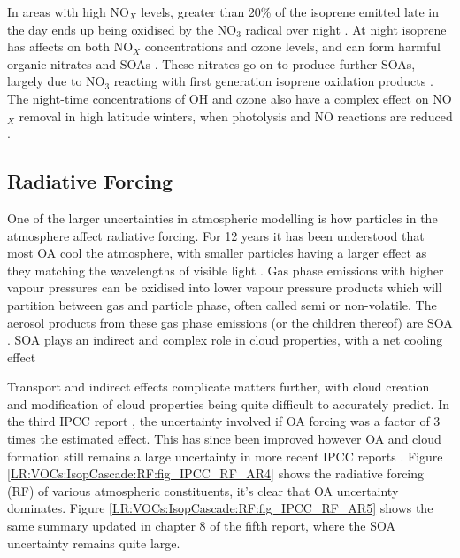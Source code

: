       In areas with high NO$_X$ levels, greater than 20\% of the isoprene emitted late in the day ends up being oxidised by the NO$_3$ radical over night \citep{Brown2009}.
      At night isoprene has affects on both NO$_X$ concentrations and ozone levels, and can form harmful organic nitrates and SOAs \citep{Brown2009, Mao2013}.
      These nitrates go on to produce further SOAs, largely due to NO$_3$ reacting with first generation isoprene oxidation products \citep{Rollins2009}.
      The night-time concentrations of OH and ozone also have a complex effect on NO$_X$ removal in high latitude winters, when photolysis and NO reactions are reduced \citep{Ayers2006}.
      
      
  \subsection{Radiative Forcing}
    \label{LR:VOCs:IsopCascade:RF}
    
    One of the larger uncertainties in atmospheric modelling is how particles in the atmosphere affect radiative forcing.
    For 12 years it has been understood that most OA cool the atmosphere, with smaller particles having a larger effect as they matching the wavelengths of visible light \citep{Kanakidou2005}.
    Gas phase emissions with higher vapour pressures can be oxidised into lower vapour pressure products which will partition between gas and particle phase, often called semi or non-volatile. 
    The aerosol products from these gas phase emissions (or the children thereof) are SOA \citep{Kanakidou2005}.
    SOA plays an indirect and complex role in cloud properties, with a net cooling effect \citep[Chapter 7,8]{IPCC_AR5_WG1}
    
    Transport and indirect effects complicate matters further, with cloud creation and modification of cloud properties being quite difficult to accurately predict.
    In the third IPCC report \citep{IPCC2001}, the uncertainty involved if OA forcing was a factor of 3 times the estimated effect. 
    This has since been improved however OA and cloud formation still remains a large uncertainty in more recent IPCC reports \citep{IPCC_Chapter2}.
    Figure \ref{LR:VOCs:IsopCascade:RF:fig_IPCC_RF_AR4} shows the radiative forcing (RF) of various atmospheric constituents, it's clear that OA uncertainty dominates.
    Figure \ref{LR:VOCs:IsopCascade:RF:fig_IPCC_RF_AR5} shows the same summary updated in chapter 8 of the fifth report, where the SOA uncertainty remains quite large.
    
